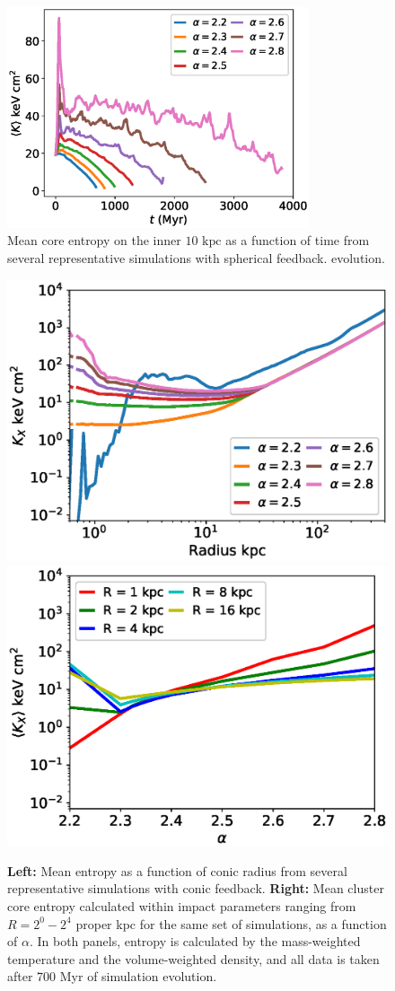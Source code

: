 \documentclass[iop,apjl, twocolappendix]{emulateapj}   %
\begin{document}
\begin{figure}
  \begin{center}
    \includegraphics[width=3.5in]{figures/spherical/avgCoreEntropies.eps}
  \end{center}
  \caption{
    \label{fig:sphericalCoreEntropies}
    Mean core entropy on the inner $10 \text{ kpc}$ as
  a function of time from several representative simulations with spherical feedback.  evolution.}
\end{figure}

\begin{figure}
	\begin{center}
		\includegraphics[width=0.49\linewidth]{figures/conic/entropyVradius.eps}
		\includegraphics[width=0.49\linewidth]{figures/conic/entropyValpha.eps}
	\end{center}
	\caption{
    \label{fig:conicEntropy}
		\textbf{Left:}  Mean entropy as a function of conic radius from
	several representative simulations with conic feedback.  \textbf{Right:} Mean cluster core
	entropy calculated within impact parameters ranging from $R = 2^0 - 2^4$ proper
	kpc for the same set of simulations, as a function of $\alpha$.  In both
	panels, entropy is calculated by the mass-weighted temperature and the
	volume-weighted density, and all data is taken after 700 Myr of simulation
	evolution.}
\end{figure}
\end{document}
